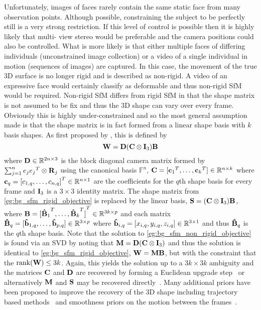 Unfortunately, images of faces rarely contain the same static
face from many observation points. Although possible, constraining the
subject to be perfectly still is a very strong restriction.
If this level of control is possible then it is highly likely that multi-
view stereo would be preferable and the camera positions could also be
controlled. What is more likely is that either multiple faces of differing
individuals (unconstrained image collection) or a video of a single individual
in motion (sequences of images) are captured. In this case, the movement
of the true 3D surface is no longer rigid and is described as non-rigid. A
video of an expressive face would certainly classify as deformable and thus
non-rigid SfM would be required. Non-rigid SfM differs from rigid SfM in
that the shape matrix is not assumed to be fix and thus the 3D shape can
vary over every frame. Obviously this is highly under-constrained and so the
most general assumption made is that the shape matrix is in fact formed
from a linear shape basis with $k$ basis shapes. As first proposed by 
\citet{bregler2000recovering}, this is defined by
\begin{equation}\label{eg:bg_sfm_non_rigid_objective}
	\boldsymbol{\mathbf{W}} = \boldsymbol{\mathbf{D}} (\boldsymbol{\mathbf{C}} \otimes \boldsymbol{\mathbf{I}}_3) \boldsymbol{\mathbf{B}}
\end{equation}
where $\boldsymbol{\mathbf{D}} \in \mathbb{R}^{2n \times 3}$ is the block diagonal camera matrix
formed by $\sum_{j=1}^n e_j {e_j}^T \otimes \boldsymbol{\mathbf{R}}_j$ using the canonical
basis $\mathbb{F}^n$,
$\boldsymbol{\mathbf{C}} = [{\boldsymbol{\mathbf{c}}_1}^T, \ldots, {\boldsymbol{\mathbf{c}}_k}^T] \in \mathbb{R}^{n \times k}$ where
$\boldsymbol{\mathbf{c}}_q = {[c_{1, q}, \ldots, c_{n, q}]}^T \in \mathbb{R}^{n \times 1}$ are the 
coefficients for the $q$th shape basis for every frame and $\boldsymbol{\mathbf{I}}_3$ is a
$3 \times 3$ identity matrix. The shape matrix from
\cref{eg:bg_sfm_rigid_objective} is replaced by the linear basis, 
$\boldsymbol{\mathbf{S}} = (\boldsymbol{\mathbf{C}} \otimes \boldsymbol{\mathbf{I}}_3) \boldsymbol{\mathbf{B}}$, where
$\boldsymbol{\mathbf{B}} = {[{\boldsymbol{\mathbf{\hat{B}}}_1}^T, \ldots, {\boldsymbol{\mathbf{\hat{B}}}_k}^T]}^T \in \mathbb{R}^{3k \times p}$
and each matrix
$\boldsymbol{\mathbf{\hat{B}}}_q = [\boldsymbol{\mathbf{\hat{b}}}_{1,q}, \ldots, \boldsymbol{\mathbf{\hat{b}}}_{p,q}] \in \mathbb{R}^{3 \times p}$
where $\boldsymbol{\mathbf{\hat{b}}}_{i,q} = [x_{i,q}, y_{i,q}, z_{i,q}] \in \mathbb{R}^{3 \times 1}$ and thus
$\boldsymbol{\mathbf{\hat{B}}}_q$ is the $q$th shape basis. Note that the solution to
\cref{eg:bg_sfm_non_rigid_objective} is found via an SVD by noting that
$\boldsymbol{\mathbf{M}} = \boldsymbol{\mathbf{D}} (\boldsymbol{\mathbf{C}} \otimes \boldsymbol{\mathbf{I}}_3)$ and thus the solution is identical
to \cref{eg:bg_sfm_rigid_objective}, $\boldsymbol{\mathbf{W}} = \boldsymbol{\mathbf{M}} \boldsymbol{\mathbf{B}}$, but with the 
constraint that the $\operatorname{rank}(\boldsymbol{\mathbf{W}}) \leq 3k$. Again, this yields the solution up 
to a $3k \times 3k$ ambiguity and the matrices $\boldsymbol{\mathbf{C}}$ and $\boldsymbol{\mathbf{D}}$ are
recovered by forming a Euclidean upgrade 
step~\cite{akhter2009defense,xiao2006closed,brand2005direct} or alternatively
$\boldsymbol{\mathbf{M}}$ and $\boldsymbol{\mathbf{S}}$ may be recovered directly~\cite{dai2014simple}.
Many additional priors have been proposed to improve the recovery of the 3D
shape including trajectory based methods~\cite{akhter2011trajectory} and
smoothness priors on the motion between the frames~\cite{bartoli2008coarse}.
